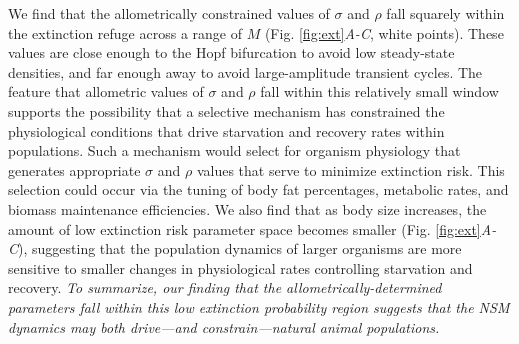 \documentclass[twocolumn,preprintnumbers,amsmath,amssymb,superscriptaddress]{revtex4}
\begin{document}
\begin{bibunit}[unsrt]
We find that the allometrically constrained values of $\sigma$ and $\rho$ fall squarely within the extinction refuge across a range of $M$ (Fig. \ref{fig:ext}\emph{A-C}, white points).
These values are close enough to the Hopf bifurcation to avoid low steady-state densities, and far enough away to avoid large-amplitude transient cycles.
The feature that allometric values of $\sigma$ and $\rho$ fall within this relatively small window supports the possibility that a selective mechanism has constrained the physiological conditions that drive starvation and recovery rates within populations.
Such a mechanism would select for organism physiology that generates appropriate $\sigma$ and $\rho$ values that serve to minimize extinction risk.
This selection could occur via the tuning of body fat percentages, metabolic rates, and biomass maintenance efficiencies.
We also find that as body size increases, the amount of low extinction risk parameter space becomes smaller (Fig. \ref{fig:ext}\emph{A-C}), suggesting that the population dynamics of larger organisms are more sensitive to smaller changes in physiological rates controlling starvation and recovery.
{\it To summarize, our finding that the allometrically-determined parameters fall within this low extinction probability region suggests that the NSM dynamics may both drive---and constrain---natural animal populations.}\\







\end{bibunit}
\end{document}
